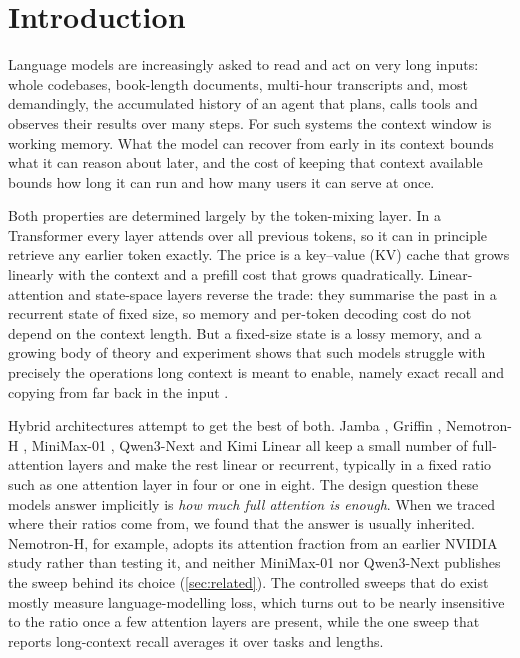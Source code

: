 \documentclass[10pt,a4paper]{article}
\begin{document}
\section{Introduction}\label{sec:intro}

Language models are increasingly asked to read and act on very long inputs: whole codebases,
book-length documents, multi-hour transcripts and, most demandingly, the accumulated history of an
agent that plans, calls tools and observes their results over many steps. For such systems the
context window is working memory. What the model can recover from early in its context bounds what
it can reason about later, and the cost of keeping that context available bounds how long it can run
and how many users it can serve at once.

Both properties are determined largely by the token-mixing layer. In a Transformer
\citep{vaswani2017attention} every layer attends over all previous tokens, so it can in principle
retrieve any earlier token exactly. The price is a key--value (KV) cache that grows linearly with the
context and a prefill cost that grows quadratically. Linear-attention and state-space layers
\citep{katharopoulos2020transformers,gu2023mamba,dao2024transformers,yang2025gated} reverse the trade:
they summarise the past in a recurrent state of fixed size, so memory and per-token decoding cost
do not depend on the context length. But a fixed-size state is a lossy memory, and a growing body of
theory and experiment shows that such models struggle with precisely the operations long context is
meant to enable, namely exact recall and copying from far back in the input
\citep{arora2023zoology,jelassi2024repeat,wen2024rnns}.

Hybrid architectures attempt to get the best of both. Jamba \citep{lieber2024jamba},
Griffin \citep{de2024griffin}, Nemotron-H \citep{nvidia2025nemotronh}, MiniMax-01
\citep{minimax2025minimax01}, Qwen3-Next \citep{qwen2025qwen3next} and Kimi Linear
\citep{kimi2025linear} all keep a small number of full-attention layers and make the rest linear or
recurrent, typically in a fixed ratio such as one attention layer in four or one in eight.
The design question these models answer implicitly is \emph{how much full attention is enough}.
When we traced where their ratios come from, we found that the answer is usually inherited. Nemotron-H,
for example, adopts its attention fraction from an earlier NVIDIA study rather than testing it, and
neither MiniMax-01 nor Qwen3-Next publishes the sweep behind its choice (\cref{sec:related}). The
controlled sweeps that do exist mostly measure language-modelling loss, which turns out to be nearly
insensitive to the ratio once a few attention layers are present, while the one sweep that reports
long-context recall averages it over tasks and lengths.
\end{document}
